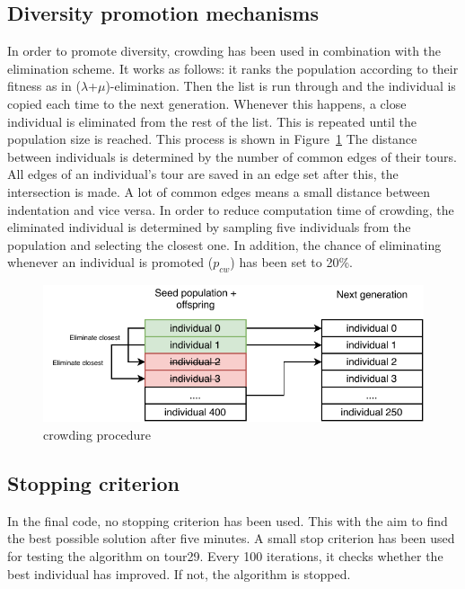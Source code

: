 \documentclass[a4paper,10pt]{article}
\newcommand{\ReplaceMe}[1]{{\color{blue}#1}}
\begin{document}
\subsection{Diversity promotion mechanisms}\label{ssec:diversitypromotion}

In order to promote diversity, crowding has been used in combination with the elimination scheme. It works as follows: it ranks the population according to their fitness as in ($\lambda$+$\mu$)-elimination. Then the list is run through and the individual is copied each time to the next generation. Whenever this happens, a close individual is eliminated from the rest of the list. This is repeated until the population size is reached. This process is shown in Figure~\ref{fig:crowding}
The distance between individuals is determined by the number of common edges of their tours. All edges of an individual's tour are saved in an edge set after this, the intersection is made. A lot of common edges means a small distance between indentation and vice versa. 
In order to reduce computation time of crowding, the eliminated individual is determined by sampling five individuals from the population and selecting the closest one. In addition, the chance of eliminating whenever an individual is promoted ($p_{cw}$) has been set to 20\%.

\begin{figure}[H]
  \centering
  \includegraphics[width=.5\textwidth]{img/crowding.pdf}
  \caption{crowding procedure}
  \label{fig:crowding}
\end{figure}
\subsection{Stopping criterion}\label{ssec:stopcriterion}

In the final code, no stopping criterion has been used. This with the aim to find the best possible solution after five minutes. A small stop criterion has been used for testing the algorithm on tour29. Every 100 iterations, it checks whether the best individual has improved. If not, the algorithm is stopped.
\end{document}
